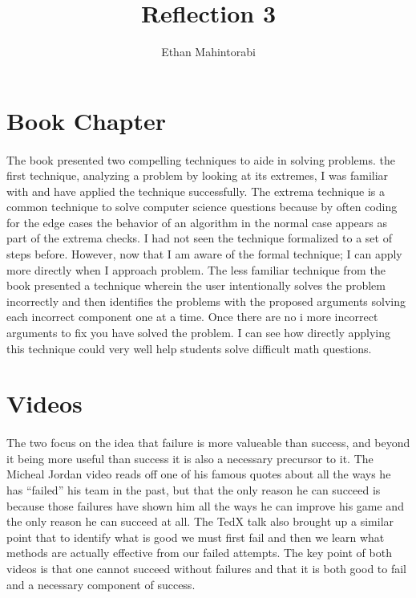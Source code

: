\documentclass{article}
\begin{document}
  
  \title{Reflection 3}
  \author{Ethan Mahintorabi}
  
  \maketitle

  
  \section*{Book Chapter}
    \paragraph{}
         The book presented two compelling techniques to aide  in solving problems. the first technique, analyzing a problem by looking at its extremes, I was familiar with and have applied the technique successfully. The extrema technique is a common technique to solve computer science questions because by often coding for the edge cases the behavior of an algorithm in the normal case appears as part of the extrema checks. I had not seen the technique formalized to a set of steps before. However, now that I am aware of the formal technique; I can apply more directly when I approach problem. The less familiar technique from the book presented a technique wherein the user intentionally solves the problem incorrectly and then identifies the problems with the proposed arguments solving each incorrect component one at a time. Once there are no i more incorrect arguments to fix you have solved the problem. I can see how directly applying this technique could very well help students solve difficult math questions.

  \section*{Videos}
    \paragraph{}
        The two focus on the idea that failure is more valueable than success, and beyond it being more useful than success it is also a necessary precursor to it. The Micheal Jordan video reads off one of his famous quotes about all the ways he has ``failed'' his team in the past, but that the only reason he can succeed is because those failures have shown him all the ways he can improve his game and the only reason he can succeed at all. The TedX talk also brought up a similar point that to identify what is good we must first fail and then we learn what methods are actually effective from our failed attempts. The key point of both videos is that one cannot succeed without failures and that it is both good to fail and a necessary component of success.
        
\end{document}
